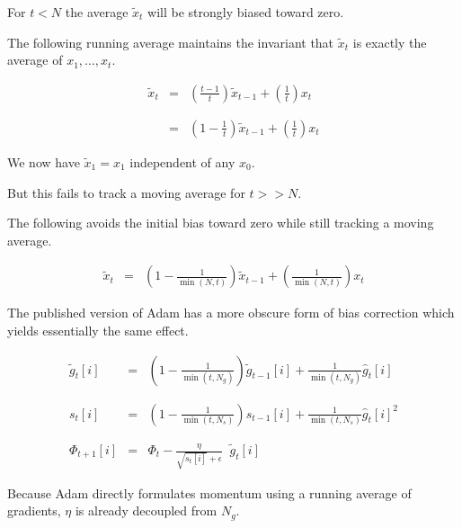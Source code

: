 {\vfill
For $t < N$ the average $\tilde{x}_t$ will be strongly biased toward zero.


The following running average maintains the invariant that $\tilde{x}_t$ is exactly the average of $x_1,\ldots,x_t$.

\begin{eqnarray*}
\tilde{x}_t & = & \left(\frac{t-1}{t}\right)\tilde{x}_{t-1} + \left(\frac{1}{t}\right)x_t \\
\\
\\
& = & \left(1-\frac{1}{t}\right)\tilde{x}_{t-1} + \left(\frac{1}{t}\right)x_t
\end{eqnarray*}

\vfill
We now have $\tilde{x}_1 = x_1$ independent of any $x_0$.

\vfill
But this fails to track a moving average for $t >> N$.


The following avoids the initial bias toward zero while still tracking a moving average.

\begin{eqnarray*}
\tilde{x}_t & = & \left(1-\frac{1}{\min(N,t)}\right)\tilde{x}_{t-1} + \left(\frac{1}{\min(N,t)}\right)x_t
\end{eqnarray*}

\vfill
The published version of Adam has a more obscure form of bias correction which yields essentially the same effect.


\begin{eqnarray*}
  \tilde{g}_{t}[i] & = & \left(1-\frac{1}{\min(t,N_g)}\right)\tilde{g}_{t-1}[i] + \frac{1}{\min(t,N_g)} \hat{g}_t[i] \\
  \\
  \\
  s_{t}[i] & = & \left(1-\frac{1}{\min(t,N_s)}\right)s_{t-1}[i] + \frac{1}{\min(t,N_s)} \hat{g}_t[i]^2 \\
  \\
  \\
\Phi_{t+1}[i] & =  & \Phi_t - \frac{\eta}{\sqrt{s_{t}[i]} + \epsilon}\;\;\tilde{g}_{t}[i]
\end{eqnarray*}


Because Adam directly formulates momentum using a running average of gradients, $\eta$ is already decoupled from $N_g$.

}

